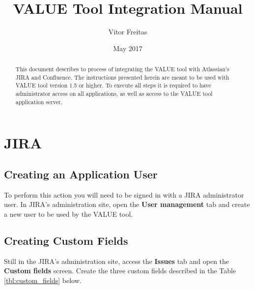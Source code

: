 \documentclass{article}
\title{VALUE Tool Integration Manual}
\author{Vitor Freitas}
\date{May 2017}
\begin{document}
\maketitle

\begin{abstract}
This document describes to process of integrating the VALUE tool with Atlassian's JIRA and Confluence. The instructions presented herein are meant to be used with VALUE tool version 1.5 or higher. To execute all steps it is required to have administrator access on all applications, as well as access to the VALUE tool application server.
\end{abstract}

\tableofcontents

\section{JIRA}
\label{jira}
\subsection{Creating an Application User}
\label{jira_app_user}

To perform this action you will need to be signed in with a JIRA administrator user. In JIRA's administration site, open the \textbf{User management} tab and create a new user to be used by the VALUE tool.


\subsection{Creating Custom Fields}
\label{jira_custom_fields}
Still in the JIRA's administration site, access the \textbf{Issues} tab and open the \textbf{Custom fields} screen. Create the three custom fields described in the Table \ref{tbl:custom_fields} below.
\end{document}
